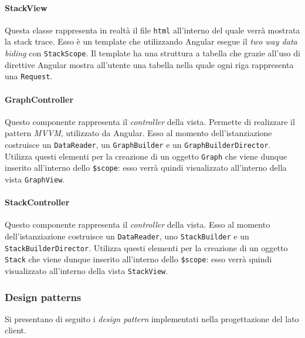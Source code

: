 \paragraph{StackView} \Spazio
Questa classe rappresenta in realtà il file \texttt{html} all'interno del quale verrà mostrata la stack trace. Esso è un template che utilizzando Angular esegue il \emph{two way data biding} con \texttt{StackScope}. Il template ha una struttura a tabella che grazie all'uso di direttive Angular mostra all'utente una tabella nella quale ogni riga rappresenta una \texttt{Request}.

\paragraph{GraphController} \Spazio
Questo componente rappresenta il \emph{controller} della vista. Permette di realizzare il pattern \emph{MVVM}, utilizzato da Angular. Esso al momento dell'istanziazione costruisce un \texttt{DataReader}, un \texttt{GraphBuilder} e un \texttt{GraphBuilderDirector}. Utilizza questi elementi per la creazione di un oggetto \texttt{Graph} che viene dunque inserito all'interno dello \texttt{\$scope}: esso verrà quindi visualizzato all'interno della vista \texttt{GraphView}.

\paragraph{StackController} \Spazio
Questo componente rappresenta il \emph{controller} della vista. Esso al momento dell'istanziazione costruisce un \texttt{DataReader}, uno \texttt{StackBuilder} e un \texttt{StackBuilderDirector}. Utilizza questi elementi per la creazione di un oggetto \texttt{Stack} che viene dunque inserito all'interno dello \texttt{\$scope}: esso verrà quindi visualizzato all'interno della vista \texttt{StackView}.



\subsubsection{Design patterns}
Si presentano di seguito i \emph{design pattern} implementati nella progettazione del lato client.

